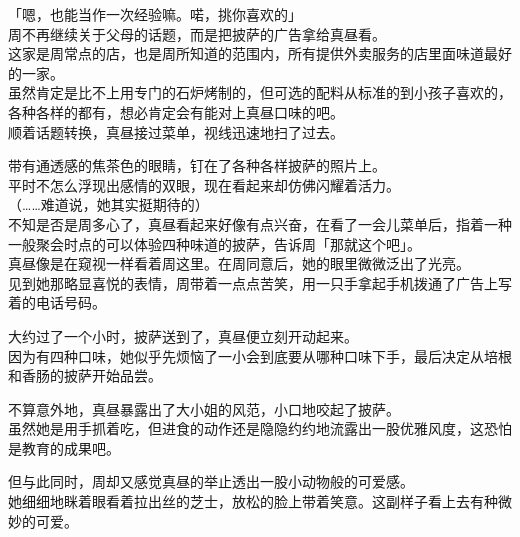 「嗯，也能当作一次经验嘛。喏，挑你喜欢的」\\

周不再继续关于父母的话题，而是把披萨的广告拿给真昼看。\\

这家是周常点的店，也是周所知道的范围内，所有提供外卖服务的店里面味道最好的一家。\\

虽然肯定是比不上用专门的石炉烤制的，但可选的配料从标准的到小孩子喜欢的，各种各样的都有，想必肯定会有能对上真昼口味的吧。\\

顺着话题转换，真昼接过菜单，视线迅速地扫了过去。

带有通透感的焦茶色的眼睛，钉在了各种各样披萨的照片上。\\

平时不怎么浮现出感情的双眼，现在看起来却仿佛闪耀着活力。\\

（……难道说，她其实挺期待的）\\

不知是否是周多心了，真昼看起来好像有点兴奋，在看了一会儿菜单后，指着一种一般聚会时点的可以体验四种味道的披萨，告诉周「那就这个吧」。\\

真昼像是在窥视一样看着周这里。在周同意后，她的眼里微微泛出了光亮。\\

见到她那略显喜悦的表情，周带着一点点苦笑，用一只手拿起手机拨通了广告上写着的电话号码。\\

\vspace{2\baselineskip}

大约过了一个小时，披萨送到了，真昼便立刻开动起来。\\

因为有四种口味，她似乎先烦恼了一小会到底要从哪种口味下手，最后决定从培根和香肠的披萨开始品尝。

不算意外地，真昼暴露出了大小姐的风范，小口地咬起了披萨。\\

虽然她是用手抓着吃，但进食的动作还是隐隐约约地流露出一股优雅风度，这恐怕是教育的成果吧。

但与此同时，周却又感觉真昼的举止透出一股小动物般的可爱感。\\

她细细地眯着眼看着拉出丝的芝士，放松的脸上带着笑意。这副样子看上去有种微妙的可爱。\\

